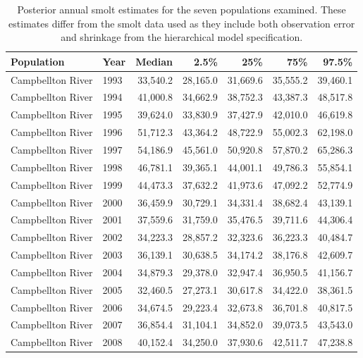 \begingroup\footnotesize
\begin{longtable}{llrrrrr}
\caption{Posterior annual smolt estimates for the seven populations examined. These
                    estimates differ from the smolt data used as they include both observation error and shrinkage from
                    the hierarchical model specification.} \\ 
  \hline
Population & Year & Median & 2.5\% & 25\% & 75\% & 97.5\% \\ 
  \hline
Campbellton River & 1993 & 33,540.2 & 28,165.0 & 31,669.6 & 35,555.2 & 39,460.1 \\ 
  Campbellton River & 1994 & 41,000.8 & 34,662.9 & 38,752.3 & 43,387.3 & 48,517.8 \\ 
  Campbellton River & 1995 & 39,624.0 & 33,830.9 & 37,427.9 & 42,010.0 & 46,619.8 \\ 
  Campbellton River & 1996 & 51,712.3 & 43,364.2 & 48,722.9 & 55,002.3 & 62,198.0 \\ 
  Campbellton River & 1997 & 54,186.9 & 45,561.0 & 50,920.8 & 57,870.2 & 65,286.3 \\ 
  Campbellton River & 1998 & 46,781.1 & 39,365.1 & 44,001.1 & 49,786.3 & 55,854.1 \\ 
  Campbellton River & 1999 & 44,473.3 & 37,632.2 & 41,973.6 & 47,092.2 & 52,774.9 \\ 
  Campbellton River & 2000 & 36,459.9 & 30,729.1 & 34,331.4 & 38,682.4 & 43,139.1 \\ 
  Campbellton River & 2001 & 37,559.6 & 31,759.0 & 35,476.5 & 39,711.6 & 44,306.4 \\ 
  Campbellton River & 2002 & 34,223.3 & 28,857.2 & 32,323.6 & 36,223.3 & 40,484.7 \\ 
  Campbellton River & 2003 & 36,139.1 & 30,638.5 & 34,174.2 & 38,176.8 & 42,609.7 \\ 
  Campbellton River & 2004 & 34,879.3 & 29,378.0 & 32,947.4 & 36,950.5 & 41,156.7 \\ 
  Campbellton River & 2005 & 32,460.5 & 27,273.1 & 30,617.8 & 34,422.0 & 38,361.5 \\ 
  Campbellton River & 2006 & 34,674.5 & 29,223.4 & 32,673.8 & 36,701.8 & 40,817.5 \\ 
  Campbellton River & 2007 & 36,854.4 & 31,104.1 & 34,852.0 & 39,073.5 & 43,543.0 \\ 
  Campbellton River & 2008 & 40,152.4 & 34,250.0 & 37,930.6 & 42,511.7 & 47,238.8 \\ 

\end{longtable}
